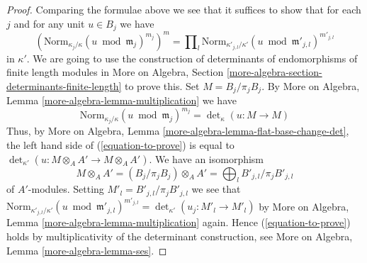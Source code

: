 \begin{proof}
\medskip\noindent
Comparing the formulae above we see that it suffices to show that
for each $j$ and for any unit $u \in B_j$ we have
\begin{equation}
\label{equation-to-prove}
\left(\text{Norm}_{\kappa_j/\kappa}(u \bmod \mathfrak m_j)^{m_j}\right)^m
=
\prod\nolimits_l
\text{Norm}_{\kappa'_{j, l}/\kappa'}(u \bmod \mathfrak m'_{j, l})^{m'_{j, l}}
\end{equation}
in $\kappa'$. We are going to use the construction of determinants of
endomorphisms of finite length modules in
More on Algebra, Section \ref{more-algebra-section-determinants-finite-length}
to prove this. Set $M = B_j/\pi_j B_j$. By
More on Algebra, Lemma \ref{more-algebra-lemma-multiplication} we have
$$
\text{Norm}_{\kappa_j/\kappa}(u \bmod \mathfrak m_j)^{m_j} =
\det\nolimits_\kappa(u : M \to M)
$$
Thus, by
More on Algebra, Lemma \ref{more-algebra-lemma-flat-base-change-det},
the left hand side of (\ref{equation-to-prove}) is equal to
$\det_{\kappa'}(u : M \otimes_A A' \to M \otimes_A A')$.
We have an isomorphism
$$
M \otimes_A A' = (B_j/\pi_j B_j) \otimes_A A' =
\bigoplus\nolimits_l B'_{j, l}/\pi_j B'_{j, l}
$$
of $A'$-modules. Setting $M'_l = B'_{j, l}/\pi_j B'_{j, l}$ we see that
$\text{Norm}_{\kappa'_{j, l}/\kappa'}(u \bmod \mathfrak m'_{j, l})^{m'_{j, l}}
= \det_{\kappa'}(u_j : M'_l \to M'_l)$ by
More on Algebra, Lemma \ref{more-algebra-lemma-multiplication} again.
Hence (\ref{equation-to-prove}) holds by multiplicativity of the determinant
construction, see More on Algebra, Lemma \ref{more-algebra-lemma-ses}.
\end{proof}






